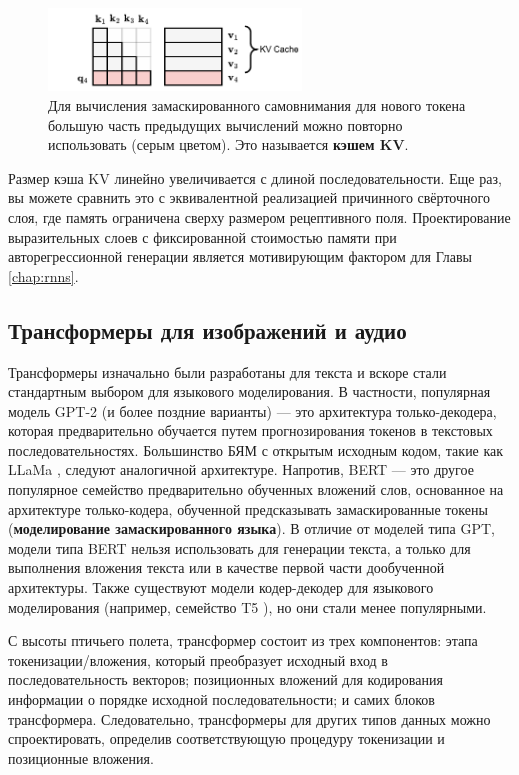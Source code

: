 \begin{figure}
    \centering
    \hspace{-0.5em}\includegraphics[width=0.6\textwidth]{images/kv_cache}
    \caption{Для вычисления замаскированного самовнимания для нового токена большую часть предыдущих вычислений можно повторно использовать (серым цветом). Это называется \textbf{кэшем KV}.}
    \label{fig:kv_cache}
\end{figure}

Размер кэша KV линейно увеличивается с длиной последовательности. Еще раз, вы можете сравнить это с эквивалентной реализацией причинного свёрточного слоя, где память ограничена сверху размером рецептивного поля. Проектирование выразительных слоев с фиксированной стоимостью памяти при авторегрессионной генерации является мотивирующим фактором для Главы \ref{chap:rnns}.

\subsection{Трансформеры для изображений и аудио} \addteacup
\label{subsec:transformers_image_audio}

Трансформеры изначально были разработаны для текста и вскоре стали стандартным выбором для языкового моделирования. В частности, популярная модель GPT-2 \cite{radford2019language} (и более поздние варианты) — это архитектура только-декодера, которая предварительно обучается путем прогнозирования токенов в текстовых последовательностях. Большинство БЯМ с открытым исходным кодом, такие как LLaMa \cite{touvron2023llama}, следуют аналогичной архитектуре. Напротив, BERT \cite{devlin2018bert} — это другое популярное семейство предварительно обученных вложений слов, основанное на архитектуре только-кодера, обученной предсказывать замаскированные токены (\textbf{моделирование замаскированного языка}). В отличие от моделей типа GPT, модели типа BERT нельзя использовать для генерации текста, а только для выполнения вложения текста или в качестве первой части дообученной архитектуры. Также существуют модели кодер-декодер для языкового моделирования (например, семейство T5 \cite{raffel2020exploring}), но они стали менее популярными.

С высоты птичьего полета, трансформер состоит из трех компонентов: этапа токенизации/вложения, который преобразует исходный вход в последовательность векторов; позиционных вложений для кодирования информации о порядке исходной последовательности; и самих блоков трансформера. Следовательно, трансформеры для других типов данных можно спроектировать, определив соответствующую процедуру токенизации и позиционные вложения.

